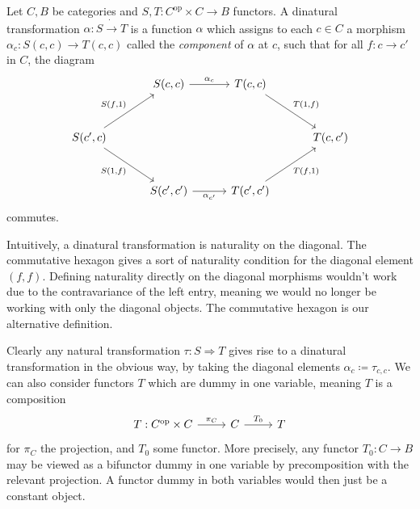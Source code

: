 \begin{definition}[Dinatural]\label{dfn:9.3}
	Let $C,B$ be categories and $S,T : C^{\mathrm{op} } \times C \to B$ functors. A dinatural transformation $\alpha : S \dot{\to} T$ is a function $\alpha$ which assigns to each $c\in C$ a morphism $\alpha_c : S(c,c) \to T(c,c)$ called the \emph{component} of $\alpha$ at $c$, such that for all $f : c \to c'$ in $C$, the diagram
	\[\begin{tikzcd}[row sep = 3em, column sep = 3em]
	 & S(c,c)\ar[" \alpha_c ", r]  & T(c,c)\ar[" T(1\text{,} f) ", dr]  & \\
	S(c',c)\ar[" S(f\text{,} 1) ", ur] \ar[" S(1\text{,} f) "', dr]  &  &  & T(c,c')  \\
	 & S(c',c')\ar[" \alpha_{c'}  "', r]  & T(c',c')\ar[" T(f\text{,} 1) "', ur] & 
	\end{tikzcd}\]
	commutes.
\end{definition}

Intuitively, a dinatural transformation is naturality on the diagonal. The commutative hexagon gives a sort of naturality condition for the diagonal element $(f,f)$. Defining naturality directly on the diagonal morphisms wouldn't work due to the contravariance of the left entry, meaning we would no longer be working with only the diagonal objects. The commutative hexagon is our alternative definition.

Clearly any natural transformation $\tau : S \Rightarrow T$ gives rise to a dinatural transformation in the obvious way, by taking the diagonal elements $\alpha_c \coloneqq \tau_{c,c} $. We can also consider functors $T$ which are dummy in one variable, meaning $T$ is a composition
\[\begin{tikzcd}[row sep = 2.5em, column sep = 2.5em]
T: C^{\mathrm{op} } \times C\ar[" \pi_C ", r]  & C\ar[" T_0 ", r]  & T
\end{tikzcd}\]
for $\pi_C$ the projection, and $T_0$ some functor. More precisely, any functor $T_0: C \to B$ may be viewed as a bifunctor dummy in one variable by precomposition with the relevant projection. A functor dummy in both variables would then just be a constant object.

